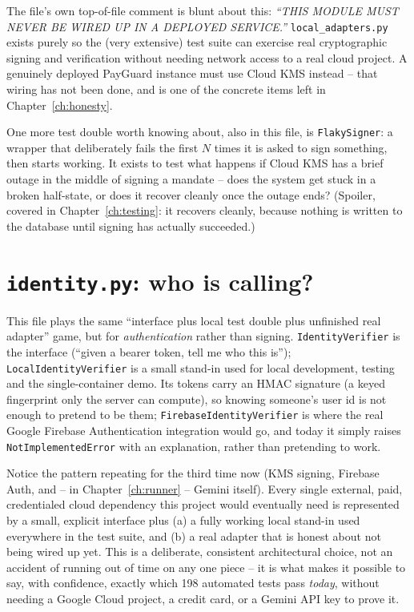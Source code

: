 \documentclass[11pt]{report}
\newcommand{\file}[1]{\texttt{#1}}
\newcommand{\code}[1]{\texttt{#1}}
\begin{document}
\begin{honesty}
The file's own top-of-file comment is blunt about this:
\emph{``THIS MODULE MUST NEVER BE WIRED UP IN A DEPLOYED SERVICE.''}
\file{local\_adapters.py} exists purely so the (very extensive) test suite
can exercise real cryptographic signing and verification without needing
network access to a real cloud project. A genuinely deployed PayGuard
instance must use Cloud KMS instead -- that wiring has not been done, and
is one of the concrete items left in Chapter~\ref{ch:honesty}.
\end{honesty}

One more test double worth knowing about, also in this file, is
\code{FlakySigner}: a wrapper that deliberately fails the first $N$ times
it is asked to sign something, then starts working. It exists to test
what happens if Cloud KMS has a brief outage in the middle of signing a
mandate -- does the system get stuck in a broken half-state, or does it
recover cleanly once the outage ends? (Spoiler, covered in
Chapter~\ref{ch:testing}: it recovers cleanly, because nothing is written
to the database until signing has actually succeeded.)

\section{\file{identity.py}: who is calling?}

This file plays the same ``interface plus local test double plus
unfinished real adapter'' game, but for \emph{authentication} rather than
signing. \code{IdentityVerifier} is the interface (``given a bearer
token, tell me who this is''); \code{LocalIdentityVerifier} is a small stand-in used for local development,
testing and the single-container demo. Its tokens carry an HMAC signature
(a keyed fingerprint only the server can compute), so knowing someone's
user id is not enough to pretend to be them;
\code{FirebaseIdentityVerifier} is where the real Google Firebase
Authentication integration would go, and today it simply raises
\code{NotImplementedError} with an explanation, rather than pretending to
work.

\begin{whyitmatters}
Notice the pattern repeating for the third time now (KMS signing,
Firebase Auth, and -- in Chapter~\ref{ch:runner} -- Gemini itself). Every
single external, paid, credentialed cloud dependency this project would
eventually need is represented by a small, explicit interface plus (a) a
fully working local stand-in used everywhere in the test suite, and (b) a
real adapter that is honest about not being wired up yet. This is a
deliberate, consistent architectural choice, not an accident of running
out of time on any one piece -- it is what makes it possible to say, with
confidence, exactly which 198 automated tests pass \emph{today}, without
needing a Google Cloud project, a credit card, or a Gemini API key to
prove it.
\end{whyitmatters}
\end{document}
